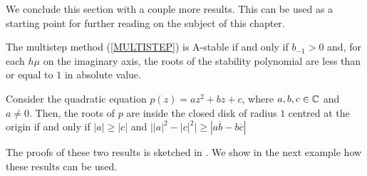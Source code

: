 We conclude this section with a couple more results.  This can be used
as a starting point for further reading on the subject of this chapter.

\begin{prop}
The multistep method (\ref{MULTISTEP}) is A-stable if and only if
$b_{-1}>0$ and, for each $h\mu$ on the imaginary axis, the roots
of the stability polynomial are less than or equal to $1$ in absolute value.
\label{Cond_A-stab}
\end{prop}

\begin{lemma}
Consider the quadratic equation $p(z) = az^2+bz+c$, where $a,b,c \in
\mathbb{C}$ and $a\not=0$.  Then, the roots of $p$ are inside the closed disk
of radius $1$ centred at the origin if and only if
$|a| \geq|c|$ and
$\big| |a|^2-|c|^2\big| \geq |a\overline{b}-b\overline{c}|$
\label{CSCrit}
\end{lemma}

The proofs of these two results is sketched in \cite{I}.  We show in the next
example how these results can be used.

